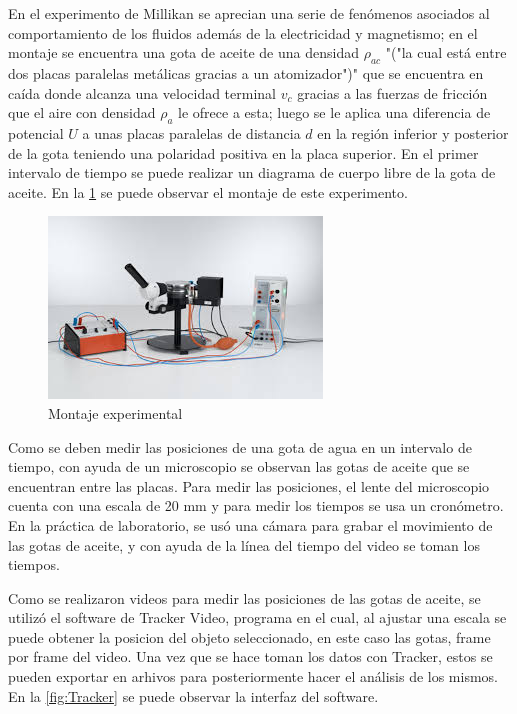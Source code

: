 En el experimento de Millikan se aprecian una serie de fenómenos asociados al 
comportamiento de los fluidos además de la electricidad y magnetismo; en el 
montaje se encuentra una gota de aceite de una densidad $\rho_{ac}$ "("la cual 
está entre dos placas paralelas metálicas gracias a un atomizador")" que se 
encuentra en caída donde alcanza una velocidad terminal $v_c$ gracias a las 
fuerzas de fricción que el aire con densidad $\rho_a$ le ofrece a esta; luego 
se le aplica una diferencia de potencial $U$ a unas placas paralelas de 
distancia $d$ en la región inferior y posterior de la gota teniendo una 
polaridad positiva en la placa superior. En el primer intervalo de tiempo se 
puede realizar un diagrama de cuerpo libre de la gota de aceite.
En la \cref{fig:Montaje} se puede observar el montaje de este experimento.

\begin{figure}[H]                                                               
    \centering                                                                  
    \includegraphics[width=0.35\linewidth]{./images/Montaje-Experimental.jpeg}      
    \caption{Montaje experimental}                                         
    \label{fig:Montaje}                                                         
\end{figure} 

Como se deben medir las posiciones de una gota de agua en un intervalo de 
tiempo, con ayuda de un microscopio se observan las gotas de aceite que se 
encuentran entre las placas. Para medir las posiciones, el lente del
microscopio cuenta con una escala de 20 mm y para medir los tiempos se usa un
cronómetro. En la práctica de laboratorio, se usó una cámara para grabar el 
movimiento de las gotas de aceite, y con ayuda de la línea del tiempo del video
se toman los tiempos.

Como se realizaron videos para medir las posiciones de las gotas de aceite, se 
utilizó el software de Tracker Video, programa en el cual, al ajustar una
escala se puede obtener la posicion del objeto seleccionado, en este caso las 
gotas, frame por frame del video. Una vez que se hace toman los datos con 
Tracker, estos se pueden exportar en arhivos para posteriormente hacer el 
análisis de los mismos. En la \cref{fig:Tracker} se puede observar la interfaz
del software.

